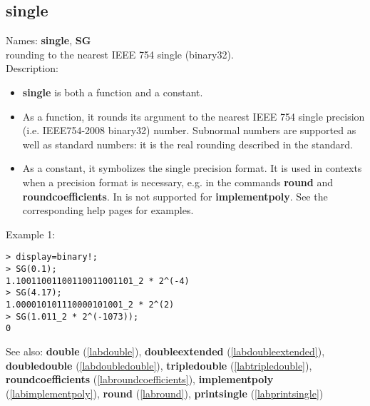 \subsection{single}
\label{labsingle}
\noindent Names: \textbf{single}, \textbf{SG}\\
rounding to the nearest IEEE 754 single (binary32).\\
\noindent Description: \begin{itemize}

\item \textbf{single} is both a function and a constant.

\item As a function, it rounds its argument to the nearest IEEE 754 single precision (i.e. IEEE754-2008 binary32) number.
   Subnormal numbers are supported as well as standard numbers: it is the real
   rounding described in the standard.

\item As a constant, it symbolizes the single precision format. It is used in 
   contexts when a precision format is necessary, e.g. in the commands 
   \textbf{round} and \textbf{roundcoefficients}. In is not supported for \textbf{implementpoly}.
   See the corresponding help pages for examples.
\end{itemize}
\noindent Example 1: 
\begin{center}\begin{minipage}{15cm}\begin{Verbatim}[frame=single]
> display=binary!;
> SG(0.1);
1.10011001100110011001101_2 * 2^(-4)
> SG(4.17);
1.000010101110000101001_2 * 2^(2)
> SG(1.011_2 * 2^(-1073));
0
\end{Verbatim}
\end{minipage}\end{center}
See also: \textbf{double} (\ref{labdouble}), \textbf{doubleextended} (\ref{labdoubleextended}), \textbf{doubledouble} (\ref{labdoubledouble}), \textbf{tripledouble} (\ref{labtripledouble}), \textbf{roundcoefficients} (\ref{labroundcoefficients}), \textbf{implementpoly} (\ref{labimplementpoly}), \textbf{round} (\ref{labround}), \textbf{printsingle} (\ref{labprintsingle})

